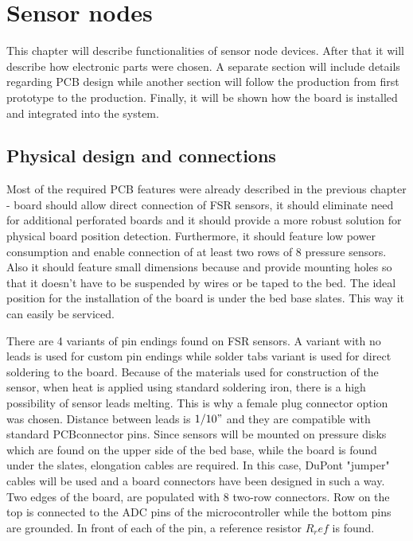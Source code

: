 \chapter{Sensor nodes}
\label{chap:nodes}

This chapter will describe functionalities of sensor node devices. After that it will describe how electronic parts were chosen. A separate section will include details regarding \ac{PCB} design while another section will follow the production from first prototype to the production. Finally, it will be shown how the board is installed and integrated into the system.

\section{Physical design and connections}

Most of the required \ac{PCB} features were already described in the previous chapter - board should allow direct connection of \ac{FSR} sensors, it should eliminate need for additional perforated boards and it should provide a more robust solution for physical board position detection. Furthermore, it should feature low power consumption and enable connection of at least two rows of 8 pressure sensors. Also it should feature small dimensions because and provide mounting holes so that it doesn't have to be suspended by wires or be taped to the bed. The ideal position for the installation of the board is under the bed base slates. This way it can easily be serviced.

There are 4 variants of pin endings found on \ac{FSR} sensors. A variant with no leads is used for custom pin endings while solder tabs variant is used for direct soldering to the board. Because of the materials used for construction of the sensor, when heat is applied using standard soldering iron, there is a high possibility of sensor leads melting. This is why a female plug connector option was chosen. Distance between leads is $1/10"$ and they are compatible with standard \ac{PCB}connector pins. Since sensors will be mounted on pressure disks which are found on the upper side of the bed base, while the board is found under the slates, elongation cables are required. In this case, DuPont "jumper" cables will be used and a board connectors have been designed in such a way. Two edges of the board, are populated with 8 two-row connectors. Row on the top is connected to the \ac{ADC} pins of the microcontroller while the bottom pins are grounded. In front of each of the pin, a reference resistor $R_ref$ is found.

